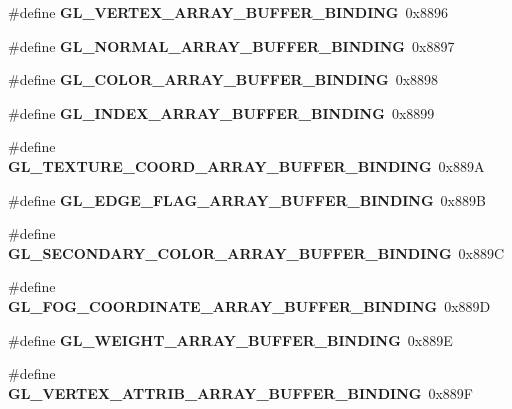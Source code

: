 \begin{DoxyCompactItemize}
\item 
\#define {\bfseries G\+L\+\_\+\+V\+E\+R\+T\+E\+X\+\_\+\+A\+R\+R\+A\+Y\+\_\+\+B\+U\+F\+F\+E\+R\+\_\+\+B\+I\+N\+D\+I\+N\+G}~0x8896\label{_s_d_l__opengl_8h_a79550920c9e83ff8535c6bf8e51b2ebb}

\item 
\#define {\bfseries G\+L\+\_\+\+N\+O\+R\+M\+A\+L\+\_\+\+A\+R\+R\+A\+Y\+\_\+\+B\+U\+F\+F\+E\+R\+\_\+\+B\+I\+N\+D\+I\+N\+G}~0x8897\label{_s_d_l__opengl_8h_ab38c3ddb781a053aa5b5f7451f4c93af}

\item 
\#define {\bfseries G\+L\+\_\+\+C\+O\+L\+O\+R\+\_\+\+A\+R\+R\+A\+Y\+\_\+\+B\+U\+F\+F\+E\+R\+\_\+\+B\+I\+N\+D\+I\+N\+G}~0x8898\label{_s_d_l__opengl_8h_aa0c030b98068db9ec0a0e49d0a0ef324}

\item 
\#define {\bfseries G\+L\+\_\+\+I\+N\+D\+E\+X\+\_\+\+A\+R\+R\+A\+Y\+\_\+\+B\+U\+F\+F\+E\+R\+\_\+\+B\+I\+N\+D\+I\+N\+G}~0x8899\label{_s_d_l__opengl_8h_a25b4469ee770b86f9cfb5a33d925bbb5}

\item 
\#define {\bfseries G\+L\+\_\+\+T\+E\+X\+T\+U\+R\+E\+\_\+\+C\+O\+O\+R\+D\+\_\+\+A\+R\+R\+A\+Y\+\_\+\+B\+U\+F\+F\+E\+R\+\_\+\+B\+I\+N\+D\+I\+N\+G}~0x889\+A\label{_s_d_l__opengl_8h_a431fc201ab69cc23b9e4040333c328c6}

\item 
\#define {\bfseries G\+L\+\_\+\+E\+D\+G\+E\+\_\+\+F\+L\+A\+G\+\_\+\+A\+R\+R\+A\+Y\+\_\+\+B\+U\+F\+F\+E\+R\+\_\+\+B\+I\+N\+D\+I\+N\+G}~0x889\+B\label{_s_d_l__opengl_8h_a609cd6a89260d808c01a1f94bfb1193f}

\item 
\#define {\bfseries G\+L\+\_\+\+S\+E\+C\+O\+N\+D\+A\+R\+Y\+\_\+\+C\+O\+L\+O\+R\+\_\+\+A\+R\+R\+A\+Y\+\_\+\+B\+U\+F\+F\+E\+R\+\_\+\+B\+I\+N\+D\+I\+N\+G}~0x889\+C\label{_s_d_l__opengl_8h_aa369d6ae05d52b3c105180927dda1680}

\item 
\#define {\bfseries G\+L\+\_\+\+F\+O\+G\+\_\+\+C\+O\+O\+R\+D\+I\+N\+A\+T\+E\+\_\+\+A\+R\+R\+A\+Y\+\_\+\+B\+U\+F\+F\+E\+R\+\_\+\+B\+I\+N\+D\+I\+N\+G}~0x889\+D\label{_s_d_l__opengl_8h_a050ffbb90bb6f9feb4823200094703d8}

\item 
\#define {\bfseries G\+L\+\_\+\+W\+E\+I\+G\+H\+T\+\_\+\+A\+R\+R\+A\+Y\+\_\+\+B\+U\+F\+F\+E\+R\+\_\+\+B\+I\+N\+D\+I\+N\+G}~0x889\+E\label{_s_d_l__opengl_8h_ac601d7cb29a4d3d35e2e7654beab6e50}

\item 
\#define {\bfseries G\+L\+\_\+\+V\+E\+R\+T\+E\+X\+\_\+\+A\+T\+T\+R\+I\+B\+\_\+\+A\+R\+R\+A\+Y\+\_\+\+B\+U\+F\+F\+E\+R\+\_\+\+B\+I\+N\+D\+I\+N\+G}~0x889\+F\label{_s_d_l__opengl_8h_a65e409180ae116e584f27b88d3429e2b}


\end{DoxyCompactItemize}
